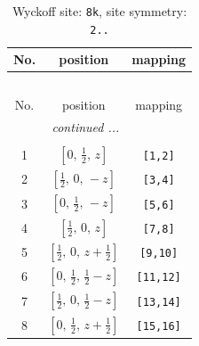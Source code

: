 \documentclass[fleqn,8pt]{jsarticle}
\begin{document}
\renewcommand{\arraystretch}{1.2}
\begin{longtable}{ccc}
\caption{Wyckoff site: {\tt 8k}, site symmetry: {\tt 2..}}
 \\
 \hline \hline
No. & position & mapping \\ \hline \endfirsthead

\multicolumn{2}{l}{\tablename\ \thetable{}} \\
 \hline \hline
No. & position & mapping \\ \hline \endhead

 \hline \hline
\multicolumn{2}{r}{\footnotesize\it continued ...} \\ \endfoot

 \hline \hline
\multicolumn{2}{r}{} \\ \endlastfoot

1 & $\left[ 0,\, \frac{1}{2},\, z \right]$ & {\tt [1,2]} \\ \hline
2 & $\left[ \frac{1}{2},\, 0,\, - z \right]$ & {\tt [3,4]} \\ \hline
3 & $\left[ 0,\, \frac{1}{2},\, - z \right]$ & {\tt [5,6]} \\ \hline
4 & $\left[ \frac{1}{2},\, 0,\, z \right]$ & {\tt [7,8]} \\ \hline
5 & $\left[ \frac{1}{2},\, 0,\, z + \frac{1}{2} \right]$ & {\tt [9,10]} \\ \hline
6 & $\left[ 0,\, \frac{1}{2},\, \frac{1}{2} - z \right]$ & {\tt [11,12]} \\ \hline
7 & $\left[ \frac{1}{2},\, 0,\, \frac{1}{2} - z \right]$ & {\tt [13,14]} \\ \hline
8 & $\left[ 0,\, \frac{1}{2},\, z + \frac{1}{2} \right]$ & {\tt [15,16]} \\
\end{longtable}
\renewcommand{\arraystretch}{1.2}
\end{document}
